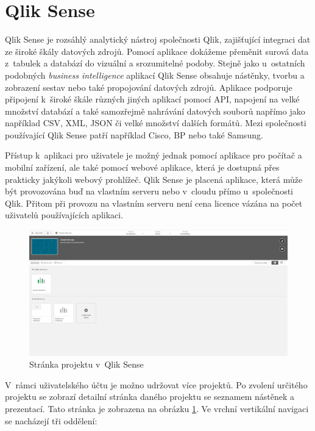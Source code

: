 \documentclass[czech,master]{diploma}
\begin{document}
\section{Qlik Sense}
\label{sec:qlik}
Qlik Sense je rozsáhlý analytický nástroj společnosti Qlik, zajišťující integraci dat ze široké škály datových zdrojů. Pomocí aplikace dokážeme přeměnit surová data z~tabulek a databází do vizuální a srozumitelné podoby. Stejně jako u~ostatních podobných \textit{business intelligence} aplikací Qlik Sense obsahuje nástěnky, tvorbu a zobrazení sestav nebo také propojování datových zdrojů. Aplikace podporuje připojení k~široké škále různých jiných aplikací pomocí API, napojení na velké množství databází a také samozřejmě nahrávání datových souborů napřímo jako například CSV, XML, JSON či velké množství dalších formátů. Mezi společnosti používající Qlik Sense patří například Cisco, BP nebo také Samsung. \cite{ref:qlik_general}

Přístup k~aplikaci pro uživatele je možný jednak pomocí aplikace pro počítač a mobilní zařízení, ale také pomocí webové aplikace, která je dostupná přes prakticky jakýkoli webový prohlížeč. Qlik Sense je placená aplikace, která může být provozována buď na vlastním serveru nebo v~cloudu přímo u~společnosti Qlik. Přitom při provozu na vlastním serveru není cena licence vázána na počet uživatelů používajících aplikaci.

\begin{figure}[!ht]
    \centering
    \includegraphics[width=1\textwidth]{Diplomka/Figures/qlik_project.png}
    \caption{Stránka projektu v~Qlik Sense}
    \label{fig:qlik_project}
\end{figure}


V~rámci uživatelského účtu je možno udržovat více projektů. Po zvolení určitého projektu se zobrazí detailní stránka daného projektu se seznamem nástěnek a prezentací. Tato stránka je zobrazena na obrázku \ref{fig:qlik_project}.  Ve vrchní vertikální navigaci se nacházejí tři oddělení:
\end{document}
